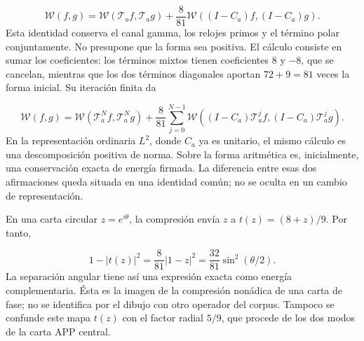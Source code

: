\begin{equation}
\boxed{\mathscr W(f,g)=\mathscr W(\mathcal T_af,\mathcal T_ag)
+\frac8{81}\mathscr W((I-C_a)f,(I-C_a)g).}
\label{viii:tm-add-balance-aritmetico}
\end{equation}
Esta identidad conserva el canal gamma, los relojes primos y el término polar conjuntamente. No presupone que la forma sea positiva. El cálculo consiste en sumar los coeficientes: los términos mixtos tienen coeficientes \(8\) y \(-8\), que se cancelan, mientras que los dos términos diagonales aportan \(72+9=81\) veces la forma inicial. Su iteración finita da

\begin{equation}
\mathscr W(f,g)=\mathscr W(\mathcal T_a^Nf,\mathcal T_a^Ng)
+\frac8{81}\sum_{j=0}^{N-1}
\mathscr W((I-C_a)\mathcal T_a^jf,(I-C_a)\mathcal T_a^jg).
\label{viii:tm-add-balance-iterado}
\end{equation}
En la representación ordinaria \(L^2\), donde \(C_a\) ya es unitario, el mismo cálculo es una descomposición positiva de norma. Sobre la forma aritmética es, inicialmente, una conservación exacta de energía firmada. La diferencia entre esas dos afirmaciones queda situada en una identidad común; no se oculta en un cambio de representación.

En una carta circular \(z=e^{i\theta}\), la compresión envía \(z\) a \(t(z)=(8+z)/9\). Por tanto,

\[
1-|t(z)|^2=\frac8{81}|1-z|^2
=\frac{32}{81}\sin^2(\theta/2).
\]
La separación angular tiene así una expresión exacta como energía complementaria. Ésta es la imagen de la compresión nonádica de una carta de fase; no se identifica por el dibujo con otro operador del corpus. Tampoco se confunde este mapa \(t(z)\) con el factor radial \(5/9\), que procede de los dos modos de la carta APP central.


